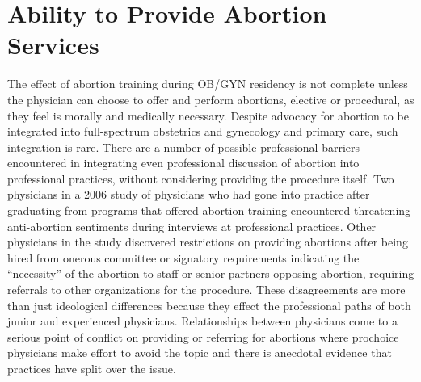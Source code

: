 \documentclass[letterpaper, 12pt]{article}
\begin{document}

\section*{Ability to Provide Abortion Services}

The effect of abortion training during OB/GYN residency is not complete unless the physician can choose to offer and perform abortions, elective or procedural, as they feel is morally and medically necessary.
Despite advocacy for abortion to be integrated into full-spectrum obstetrics and gynecology and primary care, such integration is rare. \autocite[pg. 146]{freedman_obstacles_2010} There are a number of possible professional barriers encountered in integrating even professional discussion of abortion into professional practices, without considering providing the procedure itself.
Two physicians in a 2006 study of physicians who had gone into practice after graduating from programs that offered abortion training encountered threatening anti-abortion sentiments during interviews at professional practices. \autocite[pg. 148]{freedman_obstacles_2010}
Other physicians in the study discovered restrictions on providing abortions after being hired from onerous committee or signatory requirements indicating the ``necessity'' of the abortion to staff or senior partners opposing abortion, requiring referrals to other organizations for the procedure. \autocite[pg. 148]{freedman_obstacles_2010}
These disagreements are more than just ideological differences because they effect the professional paths of both junior and experienced physicians.
Relationships between physicians come to a serious point of conflict on providing or referring for abortions where prochoice physicians make effort to avoid the topic and there is anecdotal evidence that practices have split over the issue. \autocite[pg. 149]{freedman_obstacles_2010}
\end{document}
